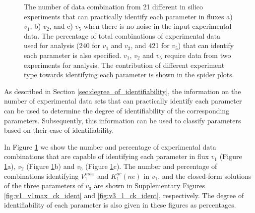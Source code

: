 \documentclass[10pt]{article}
\begin{document}
	\begin{figure}[!tbhp]
		\caption{The number of data combination from 21 different in silico experiments that can practically identify each parameter in fluxes a) $v_1$, b) $v_2$, and c) $v_5$ when there is no noise in the input experimental data. The percentage of total combinations of experimental data used for analysis (240 for $v_1$ and $v_2$, and 421 for $v_5$) that can identify each parameter is also specified. $v_1$, $v_2$ and $v_5$ require data from two experiments for analysis. The contribution of different experiment type towards identifying each parameter is shown in the spider plots.}\label{fig:ident}
	\end{figure}

	As described in Section \ref{sec:degree_of_identifiability}, the information on the number of experimental data sets that can practically identify each parameter can be used to determine the degree of identifiability of the corresponding parameters. Subsequently, this information can be used to classify parameters based on their ease of identifiability. 
		
	In Figure \ref{fig:ident} we show the number and percentage of experimental data combinations that are capable of identifying each parameter in flux $v_1$ (Figure \ref{fig:ident}a), $v_2$ (Figure \ref{fig:ident}b) and $v_5$ (Figure \ref{fig:ident}c). The number and percentage of combinations identifying $V_1^{max}$ and $K_1^{ac}(ne)$ in $v_1$, and the closed-form solutions of the three parameters of $v_3$ are shown in Supplementary Figures \ref{fig:v1_v1max_ck_ident} and \ref{fig:v3_1_ck_ident}, respectively. The degree of identifiability of each parameter is also given in these figures as percentages. 
	
\end{document}
